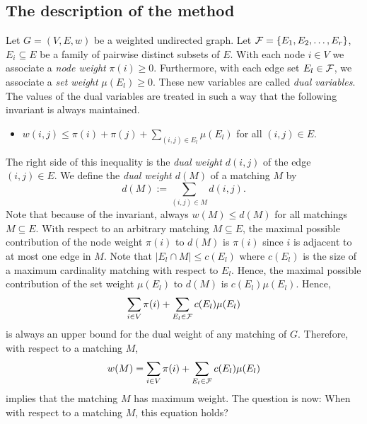\documentclass[12pt,twoside,a4paper]{article}
\begin{document}
\subsection{The description of the method}

Let $G = (V,E,w)$ be a weighted undirected graph. Let ${\cal F} = \{E_1,E_2, 
\ldots , E_r\}$, $E_i \subseteq E$ be a family of pairwise distinct subsets of 
$E$. With each node $i \in V$ we associate a {\em node weight\/} $\pi(i) 
\geq 0$. Furthermore, with each edge set $E_l \in \cal F$, we associate a 
{\em set weight\/} $\mu(E_l) \geq 0$. These new variables are called {\em dual 
variables}.
The values of the dual variables are treated in such a way that the following 
invariant is always maintained.
\begin{itemize}
\item
$w(i,j) \leq \pi(i) + \pi(j) + \sum_{(i,j) \in E_l} \mu(E_l)$ for all $(i,j) \in E$.
\end{itemize}
The right side of this inequality is the {\em dual weight $d(i,j)$} of
the edge $(i,j) \in E$.
We define the {\em dual weight $d(M)$} of a matching $M$ by
$$d(M) := \sum_{(i,j) \in M} d(i,j).$$
Note that because of the invariant, always $w(M) \leq d(M)$ for all matchings 
$M \subseteq E$.  
With respect to an arbitrary matching $M \subseteq E$, the maximal possible 
contribution of the node weight $\pi(i)$ to $d(M)$ is $\pi(i)$ since $i$ is 
adjacent to at most one edge in $M$. Note that $|E_l \cap M| \leq c(E_l)$ where
$c(E_l)$ is the size of a maximum cardinality matching with respect to $E_l$. 
Hence, the maximal possible contribution of the set weight $\mu(E_l)$ to $d(M)$ is
$c(E_l)\mu(E_l)$. Hence,
$$\sum_{i \in V}\pi(i) + \sum_{E_l \in {\cal F}}c(E_l)\mu(E_l)$$
is always an upper bound for the dual weight of any matching of $G$.
Therefore, with respect to a matching $M$, 
$$w(M) = \sum_{i \in V}\pi(i) + \sum_{E_l \in {\cal F}}c(E_l)\mu(E_l)$$ 
implies that the matching $M$ has maximum weight.
The question is now: When with respect to a matching $M$, this equation holds?
\end{document}
